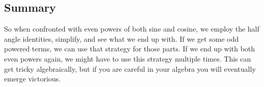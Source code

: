 \documentclass{ximera}
\begin{document}
\subsection{Summary}

So when confronted with even powers of both sine and cosine, we employ
the half angle identities, simplify, and see what we end up with.  If
we get some odd powered terms, we can use that strategy for those
parts.  If we end up with both even powers again, we might have to use
this strategy multiple times.  This can get tricky algebraically, but
if you are careful in your algebra you will eventually emerge
victorious.
\end{document}
